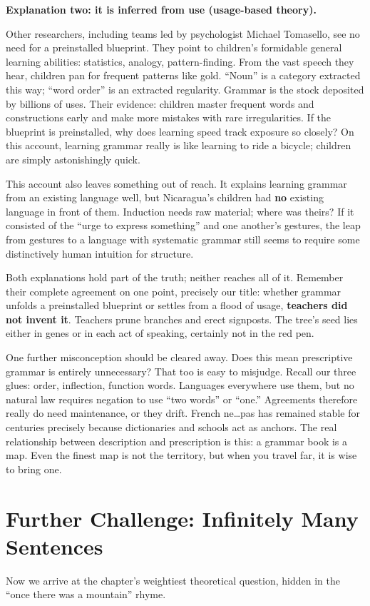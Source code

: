 \textbf{Explanation two: it is inferred from use (usage-based theory).}

Other researchers, including teams led by psychologist Michael Tomasello, see no need for a preinstalled blueprint. They point to children's formidable general learning abilities: statistics, analogy, pattern-finding. From the vast speech they hear, children pan for frequent patterns like gold. ``Noun'' is a category extracted this way; ``word order'' is an extracted regularity. Grammar is the stock deposited by billions of uses. Their evidence: children master frequent words and constructions early and make more mistakes with rare irregularities. If the blueprint is preinstalled, why does learning speed track exposure so closely? On this account, learning grammar really is like learning to ride a bicycle; children are simply astonishingly quick.

This account also leaves something out of reach. It explains learning grammar from an existing language well, but Nicaragua's children had \textbf{no} existing language in front of them. Induction needs raw material; where was theirs? If it consisted of the ``urge to express something'' and one another's gestures, the leap from gestures to a language with systematic grammar still seems to require some distinctively human intuition for structure.

Both explanations hold part of the truth; neither reaches all of it. Remember their complete agreement on one point, precisely our title: whether grammar unfolds a preinstalled blueprint or settles from a flood of usage, \textbf{teachers did not invent it}. Teachers prune branches and erect signposts. The tree's seed lies either in genes or in each act of speaking, certainly not in the red pen.

One further misconception should be cleared away. Does this mean prescriptive grammar is entirely unnecessary? That too is easy to misjudge. Recall our three glues: order, inflection, function words. Languages everywhere use them, but no natural law requires negation to use ``two words'' or ``one.'' Agreements therefore really do need maintenance, or they drift. French ne\ldots{}pas has remained stable for centuries precisely because dictionaries and schools act as anchors. The real relationship between description and prescription is this: a grammar book is a map. Even the finest map is not the territory, but when you travel far, it is wise to bring one.

\section[Further Challenge: Infinite Sentences]{Further Challenge: Infinitely Many Sentences}
Now we arrive at the chapter's weightiest theoretical question, hidden in the ``once there was a mountain'' rhyme.

